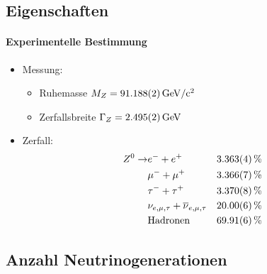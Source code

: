 \subsection{Eigenschaften}
\begin{iframe}
	\framesubtitle{Experimentelle Bestimmung}
	\begin{itemize}
		\item Messung: %
		\begin{itemize}
			\item Ruhemasse $M_Z = \SI{91.188+-0.002}{GeV/c^2}$
			\item Zerfallsbreite $\Gamma_Z = \SI{2.495+-0.002}{GeV}$
		\end{itemize}
		\pause
		\item Zerfall:
		\begin{align*}
			Z^0 \rightarrow & e^- + e^+ & \SI{3.363+-0.004}{\%} \\
			& \mu^- + \mu^+ & \SI{3.366+-0.007}{\%} \\
			& \tau^- + \tau^+ & \SI{3.370+-0.008}{\%} \\
			& \nu_{e,\mu,\tau} + \overline{\nu}_{e,\mu,\tau} & \SI{20+-0.06}{\%} \\
			& \text{Hadronen} & \SI{69.91+-0.06}{\%} \\ %
		\end{align*}
	\end{itemize}
	 {
	}
	\only<2> {
}
\end{iframe}

\subsection{Anzahl Neutrinogenerationen}

